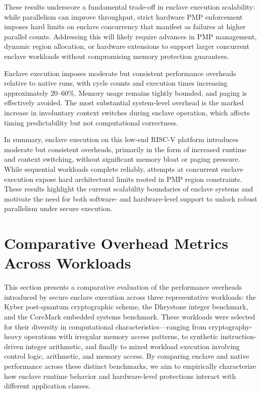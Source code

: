 These results underscore a fundamental trade-off in enclave execution scalability: while parallelism can improve throughput, strict hardware PMP enforcement imposes hard limits on enclave concurrency that manifest as failures at higher parallel counts. Addressing this will likely require advances in PMP management, dynamic region allocation, or hardware extensions to support larger concurrent enclave workloads without compromising memory protection guarantees.

Enclave execution imposes moderate but consistent performance overheads relative to native runs, with cycle counts and execution times increasing approximately 20--60\%. Memory usage remains tightly bounded, and paging is effectively avoided. The most substantial system-level overhead is the marked increase in involuntary context switches during enclave operation, which affects timing predictability but not computational correctness.

In summary, enclave execution on this low-end RISC-V platform introduces moderate but consistent overheads, primarily in the form of increased runtime and context switching, without significant memory bloat or paging pressure. While sequential workloads complete reliably, attempts at concurrent enclave execution expose hard architectural limits rooted in PMP region constraints. These results highlight the current scalability boundaries of enclave systems and motivate the need for both software- and hardware-level support to unlock robust parallelism under secure execution.

\section{Comparative Overhead Metrics Across Workloads}
\label{sec:workload-sensitivity}

This section presents a comparative evaluation of the performance overheads introduced by secure enclave execution across three representative workloads: the Kyber post-quantum cryptographic scheme, the Dhrystone integer benchmark, and the CoreMark embedded systems benchmark. These workloads were selected for their diversity in computational characteristics—ranging from cryptography-heavy operations with irregular memory access patterns, to synthetic instruction-driven integer arithmetic, and finally to mixed workload execution involving control logic, arithmetic, and memory access. By comparing enclave and native performance across these distinct benchmarks, we aim to empirically characterize how enclave runtime behavior and hardware-level protections interact with different application classes.

